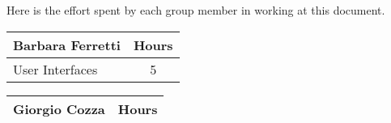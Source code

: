 Here is the effort spent by each group member in working at this document.

\begin{table}[H]
\begin{tabular}{|l|c|}
\hline
\textbf{Barbara Ferretti} & \multicolumn{1}{l|}{\textbf{Hours}} \\ \hline
User Interfaces                     & 5                                   \\ \hline


\end{tabular}
\end{table}

\begin{table}[H]
	\begin{tabular}{|l|c|}
		\hline
		\textbf{Giorgio Cozza} & \multicolumn{1}{l|}{\textbf{Hours}} \\ \hline
		
	\end{tabular}
\end{table}

